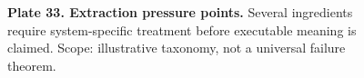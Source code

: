 \begin{figure}[p]\centering{}\caption{\textbf{Plate 33. Extraction pressure points.} Several ingredients require system-specific treatment before executable meaning is claimed. Scope: illustrative taxonomy, not a universal failure theorem.}\label{plate:extraction-pressure}\end{figure}
